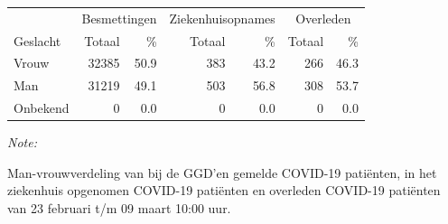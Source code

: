 \documentclass[
  english,
  man,floatsintext]{apa6}
\begin{document}
\begin{table}
\centering\begingroup\fontsize{11}{13}\selectfont

\begin{threeparttable}
\begin{tabular}{lrrrrrr}
\toprule
\multicolumn{1}{c}{ } & \multicolumn{2}{c}{Besmettingen} & \multicolumn{2}{c}{Ziekenhuisopnames} & \multicolumn{2}{c}{Overleden} \\
\cmidrule(l{3pt}r{3pt}){2-3} \cmidrule(l{3pt}r{3pt}){4-5} \cmidrule(l{3pt}r{3pt}){6-7}
Geslacht & Totaal & \% & Totaal & \% & Totaal & \%\\
\midrule
Vrouw & 32385 & 50.9 & 383 & 43.2 & 266 & 46.3\\
Man & 31219 & 49.1 & 503 & 56.8 & 308 & 53.7\\
Onbekend & 0 & 0.0 & 0 & 0.0 & 0 & 0.0\\
\bottomrule
\end{tabular}
\begin{tablenotes}
\item \textit{Note: } 
\item Man-vrouwverdeling van bij de GGD’en gemelde COVID-19 patiënten, in het ziekenhuis opgenomen COVID-19 patiënten en overleden COVID-19 patiënten van 23 februari t/m 09 maart 10:00 uur.
\end{tablenotes}
\end{threeparttable}
\endgroup{}
\end{table}
\newpage
\end{document}
